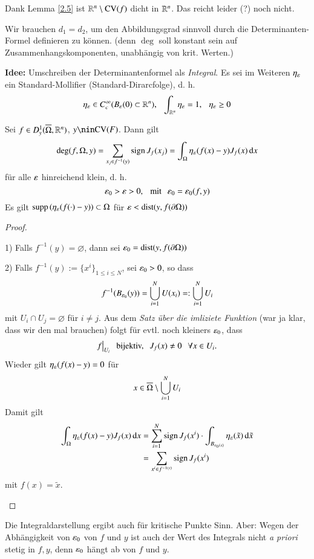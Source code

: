 \noindent Dank Lemma \ref{2.5} ist $\mathbb{R}^n\setminus \mathrm{CV}(f)$ dicht in $\mathbb{R}^n$. Das reicht leider (?)
noch nicht.

\noindent Wir brauchen $d_1=d_2$, um den Abbildungsgrad sinnvoll durch die Determinanten-Formel
definieren zu können. (denn $\deg$ soll konstant sein auf Zusammenhangskomponenten, unabhängig
von krit. Werten.)

\textbf{Idee:} Umschreiben der Determinantenformel als \textit{Integral}.
Es sei im Weiteren $\eta_\varepsilon$ ein Standard-Mollifier (Standard-Dirarcfolge), d. h.
\[
    \eta_\varepsilon \in C^\infty_c(B_\varepsilon(0)\subset \mathbb{R}^n), \hspace{.25cm} \int_{\mathbb{R}^n} \eta_\varepsilon=1,\hspace{.25cm} \eta_\varepsilon\geq 0
\]

\begin{lem}\label{2.6}
    Sei $f\in D^1_y(\overline \Omega, \mathbb{R}^n)$, $y\nin \CV(F)$. Dann gilt
    \begin{align}\label{5}
        \deg(f,\Omega,y)=\sum_{x_j\in f^{-1}(y)}\mathrm{sign}\, J_f(x_j)=\int_\Omega \eta_\varepsilon (f(x)-y) J_f(x)\, \mathrm{d} x
    \end{align}
    für alle $\varepsilon$ hinreichend klein, d. h.
    \[
        \varepsilon_0>\varepsilon>0, \hspace{.25cm} \text{mit} \hspace{.25cm} \varepsilon_0=\varepsilon_0(f,y)
    \]
    Es gilt $\mathrm{supp}\, (\eta_\varepsilon(f(\cdot)-y))\subset \Omega$ für $\varepsilon < \mathrm{dist}(y,f(\partial \Omega))$
\end{lem}

\begin{proof}
    \begin{description}
        \item{1)} 
        Falls $f^{-1}(y)=\varnothing$, dann sei $\varepsilon_0=\mathrm{dist}(y,f(\partial \Omega))$
        \item{2)}
        Falls $f^{-1}(y):= \{x^i\}_{1\leq i \leq N}$, sei $\varepsilon_0>0$, so dass
        \[
            f^{-1}(B_{\varepsilon_0}(y)) = \bigcup_{i=1}^N U(x_i)=:\bigcup_{i=1}^N U_i
        \]
        mit $U_i\cap U_j=\varnothing$ für $i\neq j$.
        Aus dem \textit{Satz über die imliziete Funktion} (war ja klar, dass wir den mal brauchen)
        folgt für evtl. noch kleiners $\varepsilon_0$, dass
        \[
            f\big|_{U_i} \hspace{.25cm} \text{bijektiv,} \hspace{.25cm} J_f(x)\neq 0 \hspace{.25cm} \forall x \in U_i.
        \]
        Wieder gilt $\eta _{\varepsilon}(f(x)-y)=0$ für
        \[
            x\in \overline \Omega \setminus \bigcup _{i=1}^N U_i
        \]
        Damit gilt
        \begin{align*}
            \int_\Omega \eta_\varepsilon(f(x)-y) J_f(x) \, \mathrm{d} x&= \sum_{i=1}^N \mathrm{sign}\, J_f(x^i)\cdot
            \int_{B_{\varepsilon_0(x)}}\eta_\varepsilon (\tilde x ) \, \mathrm{d} \tilde x\\
            &=\sum_{x^i\in f^{-1(y)}} \mathrm{sign}\,  J_f(x^i)
        \end{align*}
        mit $f(x)=\tilde x$.
    \end{description}
    \[ \]
\end{proof}
Die Integraldarstellung ergibt auch für kritische Punkte Sinn. Aber:
Wegen der Abhängigkeit von $\varepsilon_0$ von $f$ und $y$ ist auch der Wert des Integrals nicht
\textit{a priori} stetig in $f,y$, denn $\varepsilon_0$ hängt ab von $f$ und $y$.

